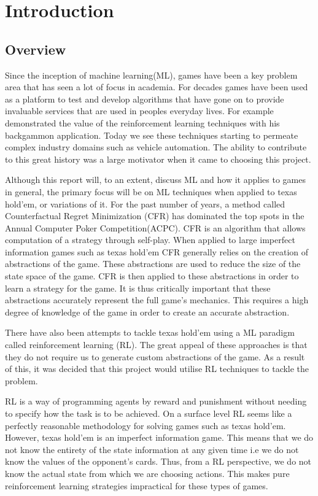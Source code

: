 \chapter{Introduction}
\label{ch:intro}

\section{Overview}\label{sec:overview}
Since the inception of machine learning(ML), games have been a key problem area that has seen a lot of focus
in academia.
For decades games have been used as a platform to test and develop algorithms that have gone on to provide invaluable
services that are used in peoples everyday lives.
For example\citep{tesauro1995td} demonstrated the value of the reinforcement learning techniques
with his backgammon application.
Today we see these techniques starting to permeate complex industry domains such as vehicle
automation\citep{desjardins2011cooperative}.
The ability to contribute to this great history was a large motivator when it came to choosing this project.

Although this report will, to an extent, discuss ML and how it applies to games in general, the
primary focus will be on ML techniques when applied to texas hold'em, or variations of it.
For the past number of years, a method called Counterfactual Regret Minimization (CFR) has dominated the
top spots in the Annual Computer Poker Competition(ACPC).
CFR is an algorithm that allows computation of a strategy through self-play.
When applied to large imperfect information games such as texas hold'em CFR generally relies on the
creation of abstractions of the game.
These abstractions are used to reduce the size of the state space of the game.
CFR is then applied to these abstractions in order to learn a strategy for the game.
It is thus critically important that these abstractions accurately represent the full game's mechanics.
This requires a high degree of knowledge of the game in order to create an accurate abstraction.

There have also been attempts to tackle texas hold'em using a ML paradigm called reinforcement
learning (RL).
The great appeal of these approaches is that they do not require us to generate custom abstractions of the game.
As a result of this, it was decided that this project would utilise RL techniques to tackle the problem.

RL is a way of programming agents by reward and punishment without needing to specify how the
task is to be achieved\citep{kaelbling1996reinforcement}.
On a surface level RL seems like a perfectly reasonable methodology for solving games such as texas hold'em.
However, texas hold'em is an imperfect information game.
This means that we do not know the entirety of the state information at any given time
i.e we do not know the values of the opponent's cards.
Thus, from a RL perspective, we do not know the actual state from which we are choosing actions.
This makes pure reinforcement learning strategies impractical for these types of games.

